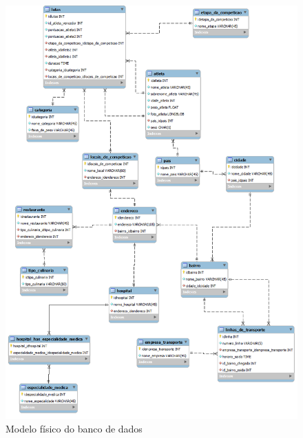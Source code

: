 \documentclass[10pt]{article}
\begin{document}
\begin{center}
\begin{figure}[h!]
\includegraphics[scale=0.45]{mf.png}
\caption{Modelo físico do banco de dados}
\end{figure}
\end{center}
\end{document}
